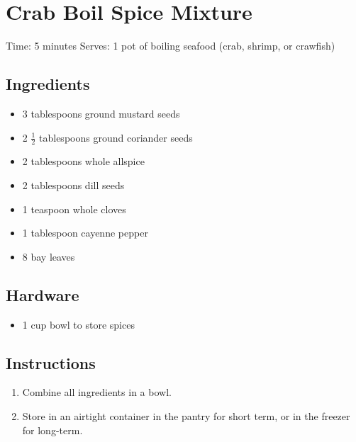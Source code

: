 \section{Crab Boil Spice Mixture}
\label{crabBoilSpiceMixture}
\setcounter{secnumdepth}{0}
Time: 5 minutes
Serves: 1 pot of boiling seafood (crab, shrimp, or crawfish)

\begin{multicols}{2}
\subsection*{Ingredients}
\begin{itemize}
    \item 3 tablespoons ground mustard seeds
    \item 2 \( \frac{1}{2} \) tablespoons ground coriander seeds
    \item 2 tablespoons whole allspice
    \item 2 tablespoons dill seeds
    \item 1 teaspoon whole cloves
    \item 1 tablespoon cayenne pepper
    \item 8 bay leaves

\end{itemize}

\subsection*{Hardware}
\begin{itemize}
    \item 1 cup bowl to store spices
\end{itemize}
\clearpage

\subsection*{Instructions}
\begin{enumerate}
    \item Combine all ingredients in a bowl.
    \item Store in an airtight container in the pantry for short term, or in the freezer for long-term.

\end{enumerate}


\end{multicols}
